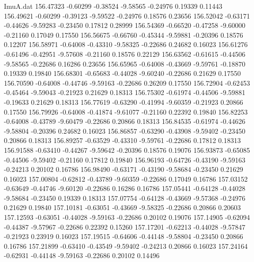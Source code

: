 \begin{filecontents}{ImuA.dat}
 156.47323   -0.60299   -0.38524   -9.58565   -0.24976    0.19339    0.11443
 156.49621   -0.60299   -0.39123   -9.59522   -0.24976    0.18576    0.23656
 156.52042   -0.63171   -0.44626   -9.59283   -0.23450    0.17812    0.28999
 156.54369   -0.66520   -0.47258   -9.60000   -0.21160    0.17049    0.17550
 156.56675   -0.66760   -0.45344   -9.59881   -0.20396    0.18576    0.12207
 156.58971   -0.64008   -0.43310   -9.58325   -0.22686    0.24682    0.16023
 156.61276   -0.61496   -0.42951   -9.57608   -0.21160    0.18576    0.22129
 156.63562   -0.61615   -0.44506   -9.58565   -0.22686    0.16286    0.23656
 156.65965   -0.64008   -0.43669   -9.59761   -0.18870    0.19339    0.19840
 156.68301   -0.65683   -0.44028   -9.60240   -0.22686    0.21629    0.17550
 156.70590   -0.64008   -0.44746   -9.59163   -0.22686    0.26209    0.17550
 156.72904   -0.62453   -0.45464   -9.59043   -0.21923    0.21629    0.18313
 156.75302   -0.61974   -0.44506   -9.59881   -0.19633    0.21629    0.18313
 156.77619   -0.63290   -0.41994   -9.60359   -0.21923    0.20866    0.17550
 156.79926   -0.64008   -0.41874   -9.61077   -0.21160    0.22392    0.19840
 156.82253   -0.64008   -0.43789   -9.60479   -0.22686    0.20866    0.18313
 156.84535   -0.61974   -0.44626   -9.58804   -0.20396    0.24682    0.16023
 156.86857   -0.63290   -0.43908   -9.59402   -0.23450    0.20866    0.18313
 156.89257   -0.63529   -0.43310   -9.59761   -0.22686    0.17812    0.18313
 156.91588   -0.63410   -0.44267   -9.59642   -0.20396    0.18576    0.19076
 156.93873   -0.65085   -0.44506   -9.59402   -0.21160    0.17812    0.19840
 156.96193   -0.64726   -0.43190   -9.59163   -0.24213    0.20102    0.16786
 156.98490   -0.63171   -0.43190   -9.58684   -0.23450    0.21629    0.16023
 157.00804   -0.62812   -0.43789   -9.60359   -0.22686    0.17049    0.16786
 157.03152   -0.63649   -0.44746   -9.60120   -0.22686    0.16286    0.16786
 157.05441   -0.64128   -0.44028   -9.58684   -0.23450    0.19339    0.18313
 157.07754   -0.64128   -0.43669   -9.57368   -0.24976    0.21629    0.19840
 157.10181   -0.63051   -0.43669   -9.58325   -0.22686    0.20866    0.20603
 157.12593   -0.63051   -0.44028   -9.59163   -0.22686    0.20102    0.19076
 157.14905   -0.62094   -0.44387   -9.57967   -0.22686    0.22392    0.15260
 157.17201   -0.62213   -0.44028   -9.57847   -0.21923    0.23919    0.16023
 157.19515   -0.64606   -0.44148   -9.58804   -0.23450    0.20866    0.16786
 157.21899   -0.63410   -0.43549   -9.59402   -0.24213    0.20866    0.16023
 157.24164   -0.62931   -0.44148   -9.59163   -0.22686    0.20102    0.14496

\end{filecontents}
